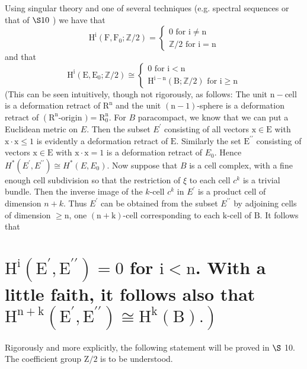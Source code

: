 \documentclass[10pt]{article}
\begin{document}
Using singular theory and one of several techniques (e.g. spectral sequences or that of $\S 10$ ) we have that
$$
\mathrm{H}^{\mathrm{i}}\left(\mathrm{F}, \mathrm{F}_{0} ; \mathbb{Z} / 2\right)=\left\{\begin{array}{l}
0 \text { for } \mathrm{i} \neq \mathrm{n} \\
\mathbb{Z} / 2 \text { for } \mathrm{i}=\mathrm{n}
\end{array}\right.
$$
and that
$$
\mathrm{H}^{\mathrm{i}}\left(\mathrm{E}, \mathrm{E}_{0} ; \mathbb{Z} / 2\right) \cong\left\{\begin{array}{l}
0 \text { for } \mathrm{i}<\mathrm{n} \\
\mathrm{H}^{\mathrm{i}-\mathrm{n}}(\mathrm{B} ; \mathbb{Z} / 2) \text { for } \mathrm{i} \geq \mathrm{n}
\end{array}\right.
$$
(This can be seen intuitively, though not rigorously, as follows: The unit $\mathrm{n}-\mathrm{cell}$ is a deformation retract of $\mathrm{R}^{\mathrm{n}}$ and the unit $(\mathrm{n}-1)$-sphere is a deformation retract of $\left(\mathrm{R}^{\mathrm{n}}\right.$-origin $)=\mathrm{R}_{0}^{\mathrm{n}}$. For $B$ paracompact, we know that we can put a Euclidean metric on $E$. Then the subset $E^{\prime}$ consisting of all vectors $\mathrm{x} \in \mathrm{E}$ with $\mathrm{x} \cdot \mathrm{x} \leq 1$ is evidently a deformation retract of $\mathrm{E}$. Similarly the set $\mathrm{E}^{\prime \prime}$ consisting of vectors $\mathrm{x} \in \mathrm{E}$ with $\mathrm{x} \cdot \mathrm{x}=1$ is a deformation retract of $E_{0}$. Hence $H^{*}\left(E^{\prime}, E^{\prime \prime}\right) \cong H^{*}\left(E, E_{0}\right)$. Now suppose that $B$ is a cell complex, with a fine enough cell subdivision so that the restriction of $\xi$ to each cell $c^{k}$ is a trivial bundle. Then the inverse image of the $k$-cell $c^{k}$ in $E^{\prime}$ is a product cell of dimension $n+k$. Thus $E^{\prime}$ can be obtained from the subset $E^{\prime \prime}$ by adjoining cells of dimension $\geq \mathrm{n}$, one $(\mathrm{n}+\mathrm{k})$-cell corresponding to each $\mathrm{k}$-cell of $\mathrm{B}$. It follows that

\section{$\mathrm{H}^{\mathrm{i}}\left(\mathrm{E}^{\prime}, \mathrm{E}^{\prime \prime}\right)=0$ for $\mathrm{i}<\mathrm{n}$. With a little faith, it follows also that $\left.\mathrm{H}^{\mathrm{n}+\mathrm{k}}\left(\mathrm{E}^{\prime}, \mathrm{E}^{\prime \prime}\right) \cong \mathrm{H}^{\mathrm{k}}(\mathrm{B}) .\right)$}
Rigorously and more explicitly, the following statement will be proved in $\S$ 10. The coefficient group $\mathrm{Z} / 2$ is to be understood.
\end{document}
